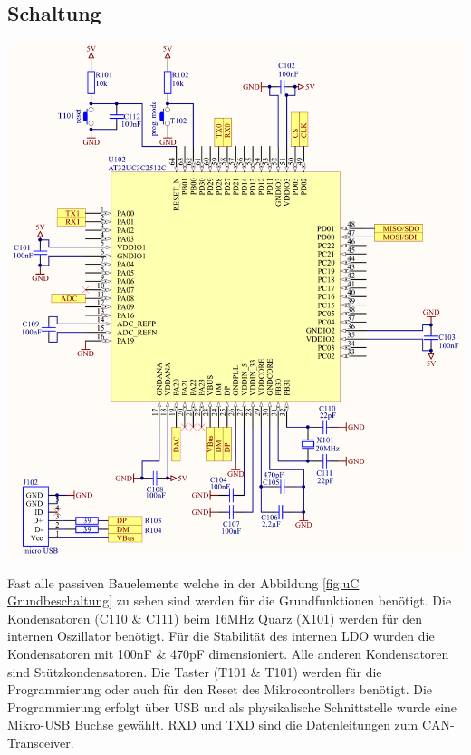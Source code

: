 \documentclass[paper=a4, 12pt]{scrreprt}
\begin{document}
		\subsection{Schaltung}
		\begin{adjustbox}{center,caption={Mikrocontroller Grundbeschaltung},label={fig:uC Grundbeschaltung},nofloat=figure,vspace=\bigskipamount}
			\includegraphics[width=\textwidth]{img/Grundbeschaltung_uC.PNG}
		\end{adjustbox}
	Fast alle passiven Bauelemente welche in der Abbildung \ref{fig:uC Grundbeschaltung} zu sehen sind werden für die Grundfunktionen benötigt. Die Kondensatoren (C110 \& C111) beim 16MHz Quarz (X101) werden für den internen Oszillator benötigt. Für die Stabilität des internen LDO wurden die Kondensatoren mit 100nF \& 470pF dimensioniert.
	Alle anderen Kondensatoren sind Stützkondensatoren. Die Taster (T101 \& T101) werden für die Programmierung oder auch für den Reset des Mikrocontrollers benötigt. Die Programmierung erfolgt über USB und als physikalische Schnittstelle wurde eine Mikro-USB Buchse gewählt. RXD und TXD sind die Datenleitungen zum CAN-Transceiver. 
\end{document}

